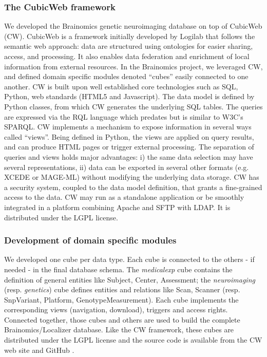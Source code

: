 \documentclass[review]{elsarticle}
\begin{document}
\subsubsection{The CubicWeb framework} We developed the Brainomics genetic neuroimaging database on top of CubicWeb (CW). CubicWeb is a framework initially developed by Logilab that follows the semantic web approach: data are structured using ontologies for easier sharing, access, and processing. It also enables data federation and enrichment of local information from external resources. In the Brainomics project, we leveraged CW, and defined domain specific modules denoted ``cubes'' easily connected to one another. CW is built upon well established core technologies such as SQL, Python, web standards (HTML5 and Javascript). The data model is defined by Python classes, from which CW generates the underlying SQL tables. The queries are expressed via the RQL language which predates but is similar to W3C's SPARQL. CW implements a mechanism to expose information in several ways called ``views''. Being defined in Python, the views are applied on query results, and can produce HTML pages or trigger external processing. The separation of queries and views holds major advantages: i) the same data selection may have several representations, ii) data can be exported in several other formats (e.g. XCEDE or MAGE-ML) without modifying the underlying data storage. CW has a security system, coupled to the data model definition, that grants a fine-grained access to the data. CW may run as a standalone application or be smoothly integrated in a platform combining Apache and SFTP with LDAP. It is distributed under the LGPL license.


\subsubsection{Development of domain specific modules}

We developed one cube per data type. Each cube is connected to the others - if needed - in the final database schema. The \textit{medicalexp} cube contains the definition of general entities like Subject, Center, Assessment; the \textit{neuroimaging} (resp. \textit{genetics}) cube defines entities and relations like Scan, Scanner (resp. SnpVariant, Platform, GenotypeMeasurement). Each cube implements the corresponding views (navigation, download), triggers and access rights. Connected together, those cubes and others are used to build the complete Brainomics/Localizer database. Like the CW framework, these cubes are distributed under the LGPL license and the source code is available from the CW web site \cite{CubicWeb} and GitHub \cite{Localizer}.
\end{document}
